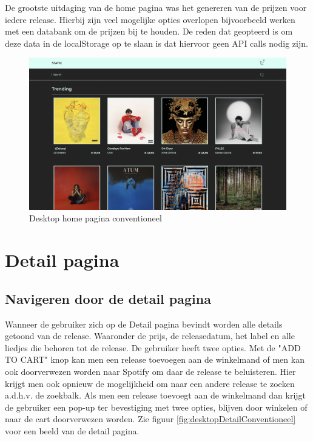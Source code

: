 De grootste uitdaging van de home pagina was het genereren van de prijzen voor iedere release. Hierbij zijn veel mogelijke opties overlopen bijvoorbeeld werken met een databank om de prijzen bij te houden. De reden dat geopteerd is om deze data in de localStorage op te slaan is dat hiervoor geen API calls nodig zijn.

\begin{figure}
	\centering
	\includegraphics[width=1\linewidth]{graphics/desktopHomeConventioneel}
	\caption[Desktop home pagina conventioneel]{Desktop home pagina conventioneel}
	\label{fig:desktopHomeConventioneel}
\end{figure}

\newpage

\section{Detail pagina}

\subsection{Navigeren door de detail pagina}

Wanneer de gebruiker zich op de Detail pagina bevindt worden alle details getoond van de release. Waaronder de prijs, de releasedatum, het label en alle liedjes die behoren tot de release. De gebruiker heeft twee opties. Met de "ADD TO CART" knop kan men een release toevoegen aan de winkelmand of men kan ook doorverwezen worden naar Spotify om daar de release te beluisteren. Hier krijgt men ook opnieuw de mogelijkheid om naar een andere release te zoeken a.d.h.v. de zoekbalk. Als men een release toevoegt aan de winkelmand dan krijgt de gebruiker een pop-up ter bevestiging met twee opties, blijven door winkelen of naar de cart doorverwezen worden. Zie figuur \ref{fig:desktopDetailConventioneel} voor een beeld van de detail pagina.

